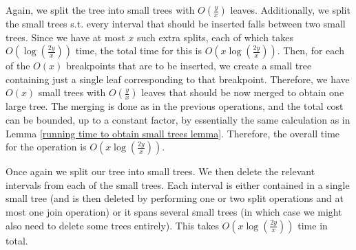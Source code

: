 \documentclass[11pt,a4paper]{article}
\theoremstyle{definition}
\theoremstyle{remark}
\begin{document}
\vspace{0.04in} 
Again, we split the tree into small trees with $O(\frac{y}{x})$ leaves. Additionally, we split the small trees s.t. every interval
that should be inserted falls between two small trees.
Since we have at most $x$ such extra splits, each of which takes $O(\log(\frac{2y}{x}))$ time, the total time for this is $O(x\log(\frac{2y}{x}))$.
Then, for each of the $O(x)$ breakpoints that are to be inserted, we create a small tree containing just a single leaf corresponding to that
breakpoint. Therefore, we have $O(x)$ small trees with $O(\frac{y}{x})$ leaves that should be now merged
to obtain one large tree.
The merging is done as in the previous operations, and the total cost can be bounded,
up to a constant factor, by essentially the same calculation as in Lemma \ref{running time to obtain small trees lemma}. Therefore, the overall time for the operation is $O(x \log(\frac{2y}{x}))$.

\vspace{0.04in} 
Once again we split our tree into small trees. We then delete the relevant intervals from each of the small trees. Each interval is either contained in a single small tree (and is then deleted by performing one or two split operations and at most one join operation) or it spans several small trees (in which case we might also need to delete some trees entirely). This takes $O(x \log(\frac{2y}{x}))$ time in total.
\end{document}
